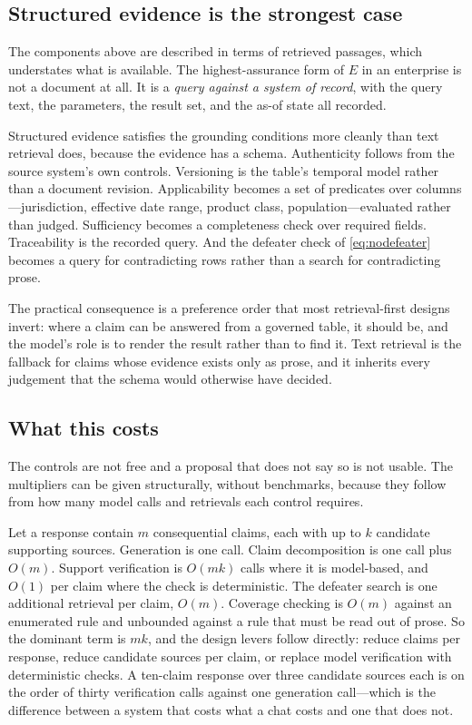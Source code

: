 \subsection{Structured evidence is the strongest case}
\label{sec:structured}

The components above are described in terms of retrieved passages, which
understates what is available. The highest-assurance form of $E$ in an enterprise is
not a document at all. It is a \emph{query against a system of record}, with the query
text, the parameters, the result set, and the as-of state all recorded.

Structured evidence satisfies the grounding conditions more cleanly than text
retrieval does, because the evidence has a schema. Authenticity follows from the source
system's own controls. Versioning is the table's temporal model rather than a document
revision. Applicability becomes a set of predicates over columns---jurisdiction,
effective date range, product class, population---evaluated rather than judged.
Sufficiency becomes a completeness check over required fields. Traceability is the
recorded query. And the defeater check of \eqref{eq:nodefeater} becomes a query for
contradicting rows rather than a search for contradicting prose.

The practical consequence is a preference order that most retrieval-first designs
invert: where a claim can be answered from a governed table, it should be, and the
model's role is to render the result rather than to find it. Text retrieval is the
fallback for claims whose evidence exists only as prose, and it inherits every
judgement that the schema would otherwise have decided.

\subsection{What this costs}
\label{sec:cost}

The controls are not free and a proposal that does not say so is not usable. The
multipliers can be given structurally, without benchmarks, because they follow from how
many model calls and retrievals each control requires.

Let a response contain $m$ consequential claims, each with up to $k$ candidate
supporting sources. Generation is one call. Claim decomposition is one call plus $O(m)$.
Support verification is $O(mk)$ calls where it is model-based, and $O(1)$ per claim where
the check is deterministic. The defeater search is one additional retrieval per claim,
$O(m)$. Coverage checking is $O(m)$ against an enumerated rule and unbounded against a
rule that must be read out of prose. So the dominant term is $mk$, and the design levers
follow directly: reduce claims per response, reduce candidate sources per claim, or
replace model verification with deterministic checks. A ten-claim response over three
candidate sources each is on the order of thirty verification calls against one
generation call---which is the difference between a system that costs what a chat costs
and one that does not.

